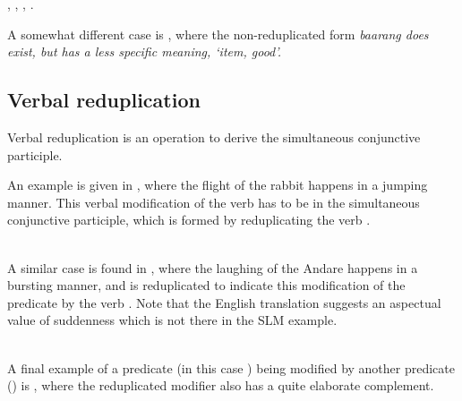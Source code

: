 ,
,
,
.

A somewhat different case is , where the non-reduplicated form \em baarang \em does exist, but has a less specific meaning, `item, good'. 


\subsection{Verbal reduplication}\label{sec:wofo:Verbalreduplication}
Verbal reduplication  is an operation to derive the simultaneous conjunctive participle.


An example is given in , where the flight of the rabbit happens in a jumping manner. This verbal modification of the verb  has to be in the simultaneous conjunctive participle, which is formed by reduplicating the verb .

\\ 

A similar case is found in , where the laughing of the Andare happens in a bursting manner, and  is reduplicated to indicate this modification of the predicate  by the verb . Note that the English translation suggests an aspectual value of suddenness which is not there in the SLM example.

\\

A final example of a predicate (in this case ) being modified by another predicate () is , where the reduplicated modifier also has a quite elaborate complement. 

\\


